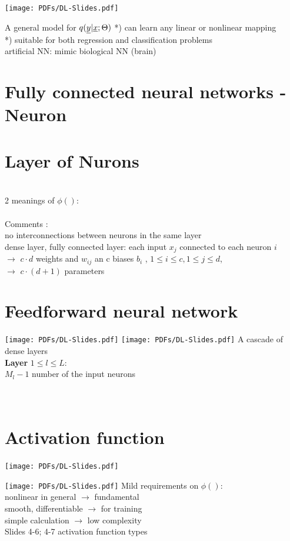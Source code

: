 \texttt{[image: PDFs/DL-Slides.pdf]}

A general model for $ q (\underline{y} | \underline{x} ; \Theta ) \\
$
*) can learn any linear or nonlinear mapping  \\
*) suitable for both regression and classification problems \\
artificial NN: mimic biological NN (brain)
\section{Fully connected neural networks - Neuron}
\section{Layer of Nurons}
\\
2 meanings of $\phi ()$: \\
 \\
Comments : \\
\textbullet no interconnections between neurons in the same layer \\
\textbullet dense layer, fully connected layer:
\qquad \textbullet each input $ x_j$ connected to each neuron $i$ \\
$\rightarrow$ $c \cdot d$ weights and $w_ {ij }$ an c biases $b_i$ , $1 \leq i \leq c, 1 \leq j \leq d$, \\
$\rightarrow$ $ c \cdot (d+1)$ parameters
\section{Feedforward neural network}
\texttt{[image: PDFs/DL-Slides.pdf]}\pagebreak
\texttt{[image: PDFs/DL-Slides.pdf]}
A cascade of dense layers \\
\textbf{Layer } $ 1 \leq l \leq L:$ \\
$M_l -1 $ number of the input neurons \\
 \\
  \\


\section{Activation function}
\texttt{[image: PDFs/DL-Slides.pdf]}

\texttt{[image: PDFs/DL-Slides.pdf]}
Mild requirements on $ \phi() $: \\
\textbullet nonlinear in general $ \rightarrow $ fundamental \\
\textbullet smooth, differentiable $ \rightarrow $ for training \\
\textbullet simple calculation $ \rightarrow $ low complexity \\
\textbullet Slides 4-6; 4-7 activation function types \\

